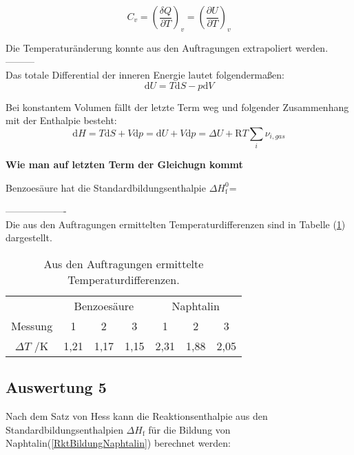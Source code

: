 \documentclass[12pt,a4paper,titlepage,headinclude,bibtotoc]{scrartcl}
\begin{document}
\begin{equation}
C_v=\left(\frac{\delta Q}{\partial T}\right)_v =\left(\frac{\partial U}{\partial T}\right)_v
\end{equation}

Die Temperaturänderung konnte aus den Auftragungen extrapoliert werden. 
---------\\

Das totale Differential der inneren Energie lautet folgendermaßen:\\

\begin{equation}
\mathrm{d}U= T\mathrm{d}S - p\mathrm{d}V
\end{equation} 

Bei konstantem Volumen fällt der letzte Term weg und folgender Zusammenhang mit der Enthalpie besteht:\\

\begin{equation}
\mathrm{d}H= T\mathrm{d}S + V\mathrm{d}p = \mathrm{d}U + V\mathrm{d}p = \Delta U +\mathrm{R}T\sum_i \nu_{i,gas}
\end{equation}

\textbf{Wie man auf letzten Term der Gleichugn kommt}

Benzoesäure hat die Standardbildungsenthalpie $\Delta H_\mathrm{f}^0$=


-------------------\\

Die aus den Auftragungen ermittelten Temperaturdifferenzen sind in Tabelle (\ref{TabDeltaT}) dargestellt. 
\FloatBarrier

\begin{table} \label{TabDeltaT}\caption{Aus den Auftragungen ermittelte Temperaturdifferenzen.}
\begin{tabular}{c|c|c|c|c|c|c}
&\multicolumn{3}{c|}{Benzoesäure} & \multicolumn{3}{c}{Naphtalin}\\ 
Messung& 1&2&3&1&2&3\\
\hline 
$\Delta T$ /K & 1,21 & 1,17 & 1,15 & 2,31 & 1,88 & 2,05 \\ 
\end{tabular} 
\end{table}




\subsection{Auswertung 5}
Nach dem Satz von Hess kann die Reaktionsenthalpie aus den Standardbildungsenthalpien $\Delta H_\mathrm{f}$ für die Bildung von Naphtalin(\ref{RktBildungNaphtalin}) berechnet werden:\\
\end{document}
